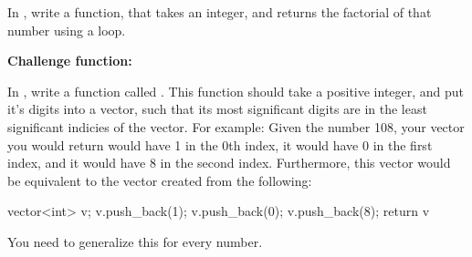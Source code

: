 \documentclass{tufte-handout}
\begin{document}
\medskip \noindent
\textbf{}
\medskip

\noindent In , write a function,  that takes an integer, and returns the factorial of that number using a loop.  

\medskip \noindent
\textbf{Challenge function: }
\medskip

\noindent In , write a function called .
This function should take a positive integer, and put it's digits into a vector, such that its most significant digits are in the least significant indicies of the vector. \newline
For example: Given the number 108, your vector you would return would have 1 in the 0th index, it would have 0 in the first index, and it would have 8 in the second index.
Furthermore, this vector would be equivalent to the vector created from the following:
\begin{Code}
vector<int> v;
v.push_back(1);
v.push_back(0);
v.push_back(8);
return v
\end{Code}
You need to generalize this for every number.
\end{document}
